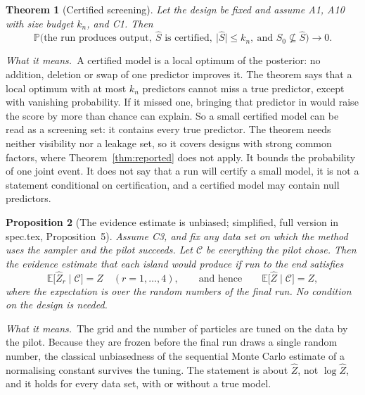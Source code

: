 \documentclass[11pt]{article}
\renewcommand{\P}{\mathbb{P}}
\newcommand{\E}{\mathbb{E}}
\newcommand{\abs}[1]{\lvert #1\rvert}
\newcommand{\Sz}{S_0}
\newcommand{\Shat}{\hat S}
\newcommand{\Zhat}{\hat Z}
\theoremstyle{plain}
\newtheorem{thm}{Theorem}
\newtheorem{prop}[thm]{Proposition}
\theoremstyle{definition}
\newcommand{\means}{\par\smallskip\noindent\textit{What it means.}\ }
\begin{document}
\begin{thm}[Certified screening]\label{thm:screen}
Let the design be fixed and assume A1, A10 with size budget $k_n$, and C1. Then
\[
  \P\big(\text{the run produces output},\ \Shat\text{ is certified},\ \abs{\Shat}\le k_n,\ \text{and }\Sz\not\subseteq\Shat\big)\to0 .
\]
\end{thm}
\means A certified model is a local optimum of the posterior: no addition, deletion or swap of one predictor improves
it. The theorem says that a local optimum with at most $k_n$ predictors cannot miss a true predictor, except with
vanishing probability. If it missed one, bringing that predictor in would raise the score by more than chance can
explain. So a small certified model can be read as a screening set: it contains every true predictor. The theorem needs
neither visibility nor a leakage set, so it covers designs with strong common factors, where Theorem~\ref{thm:reported}
does not apply. It bounds the probability of one joint event. It does not say that a run will certify a small model, it
is not a statement conditional on certification, and a certified model may contain null predictors.

\begin{prop}[The evidence estimate is unbiased; simplified, full version in spec.tex, Proposition~5]\label{prop:unbiased}
Assume C3, and fix any data set on which the method uses the sampler and the pilot succeeds. Let $\mathcal C$ be
everything the pilot chose. Then the evidence estimate that each island would produce if run to the end satisfies
\[
  \E\big[\Zhat_r\mid\mathcal C\big]=Z\quad(r=1,\dots,4),\qquad\text{and hence}\qquad \E\big[\Zhat\mid\mathcal C\big]=Z ,
\]
where the expectation is over the random numbers of the final run. No condition on the design is needed.
\end{prop}
\means The grid and the number of particles are tuned on the data by the pilot. Because they are frozen before the
final run draws a single random number, the classical unbiasedness of the sequential Monte Carlo estimate of a
normalising constant survives the tuning. The statement is about $\Zhat$, not $\log\Zhat$, and it holds for every data
set, with or without a true model.
\end{document}
